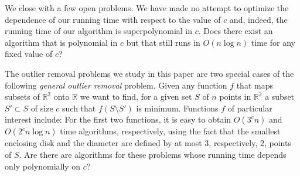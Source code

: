 \documentclass[lotsofwhite]{patmorin}
\begin{document}
We close with a few open problems. We have made no attempt to optimize
the dependence of our running time with respect to the value of $c$
and, indeed, the running time of our algorithm is superpolynomial in
$c$. Does there exist an algorithm that is polynomial in $c$ but that
still runs in $O(n\log n)$ time for any fixed value of $c$?

The outlier removal problems we study in this paper are two special
cases of the following \emph{general outlier removal} problem.  Given
any function $f$ that maps subsets of $\mathbb{R}^2$ onto $\mathbb{R}$
we want to find, for a given set $S$ of $n$ points in $\mathbb{R}^2$ a
subset $S'\subset S$ of size $c$ such that $f(S\setminus S')$ is
minimum.  Functions $f$ of particular interest include:
For the first two functions, it is easy to obtain $O(3^c n)$ and
$O(2^cn\log n)$ time algorithms, respectively, using the fact that the
smallest enclosing disk and the diameter are defined by at most 3,
respectively, 2, points of $S$.  Are there are algorithms for these
problems whose running time depends only polynomially on $c$?



\end{document}

